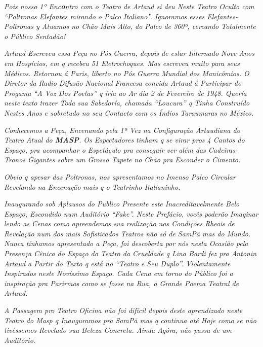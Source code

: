 \emph{Pois nosso 1º Enc\textbf{o}ntro com o Teatro de Artaud si deu
Neste Teatro Oculto com ``Poltronas Elefantes mirando o Palco
Italiano''. Ignoramos esses Elefantes-Poltronas y Atuamos no Chão Mais
Alto, do Palco de 360º, cercando Totalmente o Público Sentadão!}

\emph{Artaud Escreveu essa Peça no Pós Guerra, depois de estar Internado
Nove Anos em Hospícios, em q recebeu 51 Eletrochoques. Mas escreveu
muito para seus Médicos. Retornou á Paris, liberto no Pós Guerra Mundial
dos Manicômios. O Diretor da Radio Difusão Nacional Francesa convida
Artaud á Participar do Progama ``A Voz Dos Poetas'' q iria ao Ar dia 2
de Fevereiro de 1948. Quería neste texto trazer Toda sua Sabedoría,
chamada ``Loucura'' q Tinha Construído Nestes Anos e sobretudo no seu
Contacto com os Índios Taraumaras no México.}

\emph{Conhecemos a Peça, Encenando pela 1ª Vez na Configuração
Artaudiana do Teatro Atual do \textbf{MASP}. Os Espectadores tinham q se
virar pros 4 Cantos do Espaço, pra acompanhar o Espetáculo pra conseguir
ver além das Cadeiras-Tronos Gigantes sobre um Grosso Tapete no Chão pra
Esconder o Cimento.}

\emph{Obvio q apesar das Poltronas, nos apresentamos no Imenso Palco
Circular Revelando na Encenação mais q o Teatrinho Italianinho.}

\emph{Inaugurando sob Aplausos do Publico Presente este
Inacreditavelmente Belo Espaço, Escondido num Auditório ``Fake''. Neste
Prefácio, vocês poderão Imaginar lendo as Cenas como apreendemos sua
realização nas Condições Rheais de Revelação num dos mais Sofisticados
Teatros não só de SamPã mas do Mundo. Nunca tínhamos apresentado a Peça,
foi descoberta por nós nesta Ocasião pela Presença Cênica do Espaço do
Teatro da Crueldade q Lina Bardi fez pra Antonin Artaud a Partir do
Texto q está no ``Teatro e Seu Duplo''. Violentamente Inspirados neste
Novíssimo Espaço. Cada Cena em torno do Público foi a inspiração pra
Parirmos como se fosse na Rua, o Grande Poema Teatral de Artaud.}

\emph{A Passagem pro Teatro Oficina não foi difícil depois deste
aprendizado neste Teatro do Masp q Inauguramos pra SamPã mas q continua
até Hoje como se não tivéssemos Revelado sua Beleza Concreta. Ainda
Agóra, não passa de um Auditório.}

